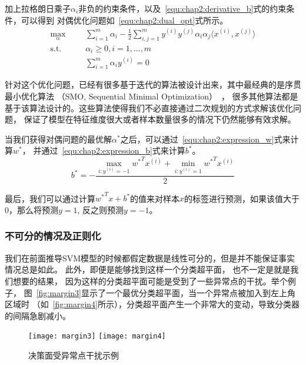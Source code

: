 加上拉格朗日乘子$\alpha_i$非负的约束条件，以及~\ref{equ:chap2:derivative_b}式的约束条件，可以得到
对偶优化问题如~\ref{equ:chap2:dual_opt}式所示。
\begin{equation}
  \label{equ:chap2:dual_opt}
  \begin{aligned}
    \max_{\alpha} &
    & & \sum_{i=1}^m\alpha_i-\frac{1}{2}\sum_{i,j=1}^m
    y^{(i)}y^{(j)}\alpha_i\alpha_j\langle x^{(i)},x^{(j)}\rangle\\
    \text{s.t.} &
    & & \alpha_i\geq 0, i=1,...,m \\
    \quad &
    & & \sum_{i=1}^m\alpha_iy^{(i)}=0
  \end{aligned}
\end{equation}

针对这个优化问题，已经有很多基于迭代的算法被设计出来，其中最经典的是序贯最小优化算法
（SMO, Sequential Minimal Optimization）~\cite{platt1998sequential}，
很多其他算法都是基于该算法设计的。这些算法使得我们不必直接通过二次规划的方式求解该优化问题，
保证了模型在特征维度很大或者样本数量很多的情况下仍然能够有效求解。

当我们获得对偶问题的最优解$\alpha^*$之后，可以通过~\ref{equ:chap2:expression_w}式来计算$w^*$，
并通过~\ref{equ:chap2:expression_b}式来计算$b^*$。
\begin{equation}
  \label{equ:chap2:expression_b}
  b^*=-\frac{\max_{i:y^{(i)}=-1}{w^*}^Tx^{(i)}+\min_{i:y^{(i)}=1}{w^*}^Tx^{(i)}}{2}
\end{equation}

最后，我们可以通过计算${w^*}^Tx+b^*$的值来对样本$x$的标签进行预测，如果该值大于0，那么将预测$y=1$,
反之则预测$y=-1$。

\subsubsection{不可分的情况及正则化}

我们在前面推导SVM模型的时候都假定数据是线性可分的，但是并不能保证事实情况总是如此。
此外，即便是能够找到这样一个分类超平面， 也不一定是就是我们想要的结果，
因为这样的分类超平面可能是受到了一些异常点的干扰。举个例子，
图~\ref{fig:margin3}显示了一个最优分类超平面，当一个异常点被加入到左上角区域时
（如~\ref{fig:margin4}所示），分类超平面产生一个非常大的变动，导致分类器的间隔急剧减小。
\begin{figure}[ht]
  \centering%
  {\texttt{[image: margin3]}}%
  \hspace{6em}%
  {\texttt{[image: margin4]}}
  \caption{决策面受异常点干扰示例}
  \label{fig:margin3+4}
\end{figure}

